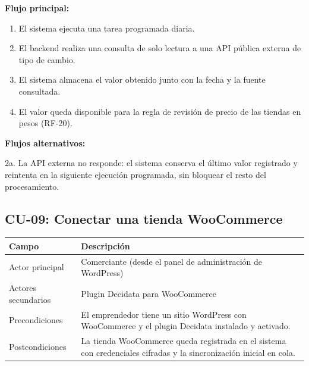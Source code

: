 \noindent\textbf{Flujo principal:}
\begin{enumerate}
    \item El sistema ejecuta una tarea programada diaria.
    \item El backend realiza una consulta de solo lectura a una API pública externa de tipo de cambio.
    \item El sistema almacena el valor obtenido junto con la fecha y la fuente consultada.
    \item El valor queda disponible para la regla de revisión de precio de las tiendas en pesos (RF-20).
\end{enumerate}

\noindent\textbf{Flujos alternativos:}

\noindent 2a. La API externa no responde: el sistema conserva el último valor registrado y reintenta en la siguiente ejecución programada, sin bloquear el resto del procesamiento.

\subsection{CU-09: Conectar una tienda WooCommerce}
\label{sec:cu-09}

\begin{table}[h]
\centering
\renewcommand{\arraystretch}{1.3}
\begin{tabular}{|m{3cm}|m{11.3cm}|}
\hline
\textbf{Campo} & \textbf{Descripción} \\
\hline
Actor principal & Comerciante (desde el panel de administración de WordPress) \\
\hline
Actores secundarios & Plugin Decidata para WooCommerce \\
\hline
Precondiciones & El emprendedor tiene un sitio WordPress con WooCommerce y el plugin Decidata instalado y activado. \\
\hline
Postcondiciones & La tienda WooCommerce queda registrada en el sistema con credenciales cifradas y la sincronización inicial en cola. \\
\hline
\end{tabular}
\end{table}

